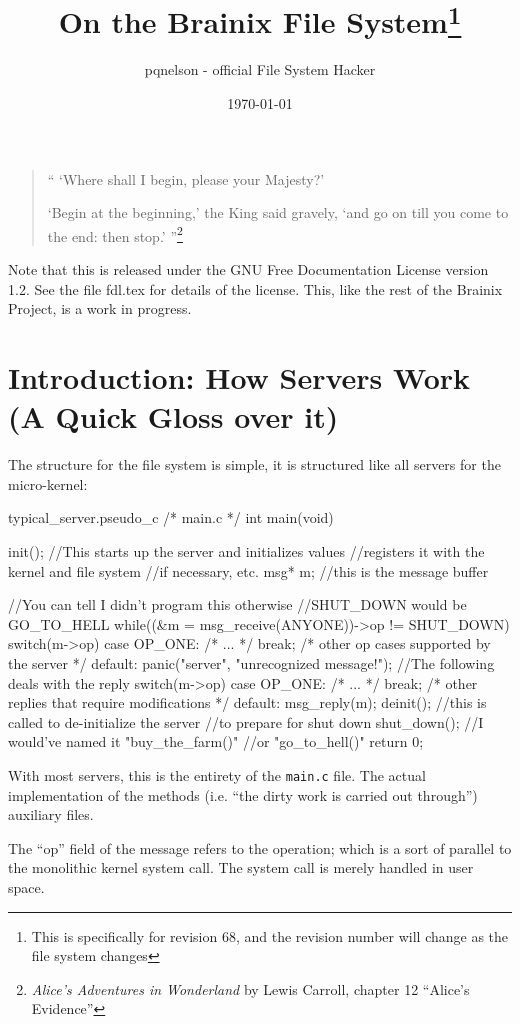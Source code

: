 \documentclass{article}
\title{On the Brainix File System\footnote{This is specifically for revision 68, and the revision number will change as the file system changes}}
\author{pqnelson - official File System Hacker}
\date{\today}
\begin{document}
 \maketitle
\begin{quote}
 `` `Where shall I begin, please your Majesty?' 

\indent `Begin at the beginning,' the King said gravely, `and go on till you come to the end: then stop.' ''\footnote{\textit{Alice's Adventures in Wonderland} by Lewis Carroll, chapter 12 ``Alice's Evidence''}
\end{quote}

Note that this is released under the GNU Free Documentation License version 1.2. See the file fdl.tex for details of the license. This, like the rest of the Brainix Project, is a work in progress.\
\section{Introduction: How Servers Work (A Quick Gloss over it)}
The structure for the file system is simple, it is structured like all servers for the micro-kernel:
\begin{code}{typical\_server.pseudo\_c}
 /* main.c */
int main(void) {
     init(); //This starts up the server and initializes values
             //registers it with the kernel and file system
             //if necessary, etc.
     msg* m; //this is the message buffer

     //You can tell I didn't program this otherwise 
     //SHUT_DOWN would be GO_TO_HELL
     while((&m = msg_receive(ANYONE))->op != SHUT_DOWN) 
     {
          switch(m->op) {
               case OP_ONE: /* ... */ break;
               /* other op cases supported by the server */
               default: panic("server", "unrecognized message!");
          }
          //The following deals with the reply
          switch(m->op)
          {
               case OP_ONE: /* ... */ break;
               /* other replies that require modifications */
               default: msg_reply(m);
          }
     }
     deinit(); //this is called to de-initialize the server
               //to prepare for shut down
     shut_down(); //I would've named it "buy_the_farm()"
                  //or "go_to_hell()"
     return 0;
}
\end{code}
With most servers, this is the entirety of the \verb|main.c| file. The actual implementation of the methods (i.e. ``the dirty work is carried out through'') auxiliary files.

The ``op'' field of the message refers to the operation; which is a sort of parallel to the monolithic kernel system call. The system call is merely handled in user space.
\end{document}
